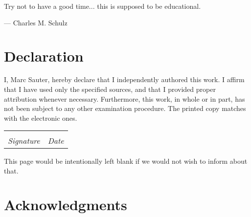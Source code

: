 \documentclass[12pt, twoside, a4paper]{report}
\date{}
\makeatletter
\newlength\drop
\newcommand*{\titlethesis}{%
	\begingroup
	\drop = 0.1\textheight
	\noindent
	\begin{minipage}[t]{0.5\textwidth}
		\texttt{[image: logos/UniStuttgartLogo.png]}
	\end{minipage}
	\begin{minipage}[t]{0.5\textwidth}
		\hfill
		\texttt{[image: logos/ICPLogo.png]}
	\end{minipage}
	
	\centering
	\vspace*{\drop}
	{\LARGE\bfseries Investigating the Evolution of Fisher information for Neural Network Training}\\[2\baselineskip] %
	{\large By}\\
	{\large Marc Sauter\footnote{\href{mailto:msauter@icp.uni-stuttgart.de}{msauter@icp.uni-stuttgart.de}}}\\[3\baselineskip]
	{\large A bachelor's thesis submitted to the}\\[\baselineskip]
	\begin{table}[H]
		\centering
		\begin{tabular}{c}
			{\large\bfseries\scshape Institute for Computational Physics}\\[5pt]
			{University of Stuttgart}\\
			{Allmandring 3}\\
			{70569 Stuttgart}
		\end{tabular}
	\end{table}
	\vspace*{0.2\baselineskip}
	\begin{table}[H]
		\centering
		\large
		\begin{tabular}{ll}
			Advisor: & M. Sc. Samuel Tovey\\
			Supervisor: & Prof. Dr. Christian Holm
		\end{tabular}
	\end{table}
	\vspace*{5pt}
	{Stuttgart, }\\ %
	{Edited version from \today}\\
	\par
	\endgroup
}
\makeatother
\begin{document}
%	
%	
	
	\newpage
	\thispagestyle{empty}
	\epigraph{Try not to have a good time... this is supposed to be educational.}{--- \textup{Charles M. Schulz}}
	
	
	\thispagestyle{empty}
	\chapter*{Declaration}
	I, Marc Sauter, hereby declare that I independently authored this work. I affirm that I have used only the specified sources, and that I provided proper attribution whenever necessary. Furthermore, this work, in whole or in part, has not been subject to any other examination procedure. The printed copy matches with the electronic ones.
	
	\vspace{3cm}
	\noindent\begin{tabular}{ll}
		\makebox[2.5in]{\hrulefill} & \makebox[2.5in]{\hrulefill}\\
		\textit{Signature} & \textit{Date}\\
	\end{tabular}

	\thispagestyle{empty}
	\begin{otherlanguage}{ngerman}
		\begin{abstract}
		
		\end{abstract}
	\end{otherlanguage}
	
	\thispagestyle{empty}
	\begin{abstract}
		
		
	\end{abstract}
	
	\vspace*{\fill}
	{\centering This page would be intentionally left blank if we would not wish to inform about that.\par}
	\vspace{\fill}

	\thispagestyle{empty}
	\chapter*{Acknowledgments}
	
	
\end{document}
